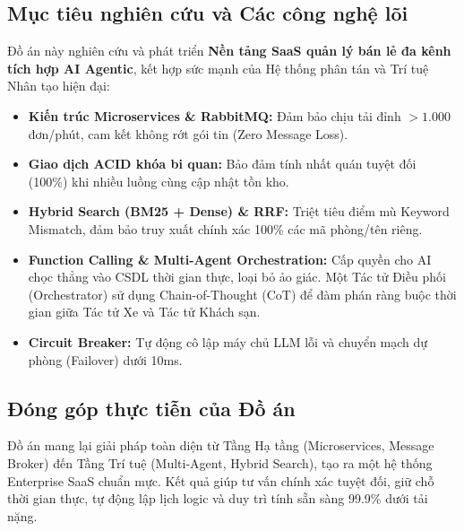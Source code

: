 \subsection{Mục tiêu nghiên cứu và Các công nghệ lõi}
Đồ án này nghiên cứu và phát triển \textbf{Nền tảng SaaS quản lý bán lẻ đa kênh tích hợp AI Agentic}, kết hợp sức mạnh của Hệ thống phân tán và Trí tuệ Nhân tạo hiện đại:
\begin{itemize}
    \item \textbf{Kiến trúc Microservices \& RabbitMQ:} Đảm bảo chịu tải đỉnh $>1.000$ đơn/phút, cam kết không rớt gói tin (Zero Message Loss).
    \item \textbf{Giao dịch ACID khóa bi quan:} Bảo đảm tính nhất quán tuyệt đối (100\%) khi nhiều luồng cùng cập nhật tồn kho.
    \item \textbf{Hybrid Search (BM25 + Dense) \& RRF:} Triệt tiêu điểm mù Keyword Mismatch, đảm bảo truy xuất chính xác 100\% các mã phòng/tên riêng.
    \item \textbf{Function Calling \& Multi-Agent Orchestration:} Cấp quyền cho AI chọc thẳng vào CSDL thời gian thực, loại bỏ ảo giác. Một Tác tử Điều phối (Orchestrator) sử dụng Chain-of-Thought (CoT) để đàm phán ràng buộc thời gian giữa Tác tử Xe và Tác tử Khách sạn.
    \item \textbf{Circuit Breaker:} Tự động cô lập máy chủ LLM lỗi và chuyển mạch dự phòng (Failover) dưới 10ms.
\end{itemize}

\subsection{Đóng góp thực tiễn của Đồ án}
Đồ án mang lại giải pháp toàn diện từ Tầng Hạ tầng (Microservices, Message Broker) đến Tầng Trí tuệ (Multi-Agent, Hybrid Search), tạo ra một hệ thống Enterprise SaaS chuẩn mực. Kết quả giúp tư vấn chính xác tuyệt đối, giữ chỗ thời gian thực, tự động lập lịch logic và duy trì tính sẵn sàng 99.9\% dưới tải nặng.
